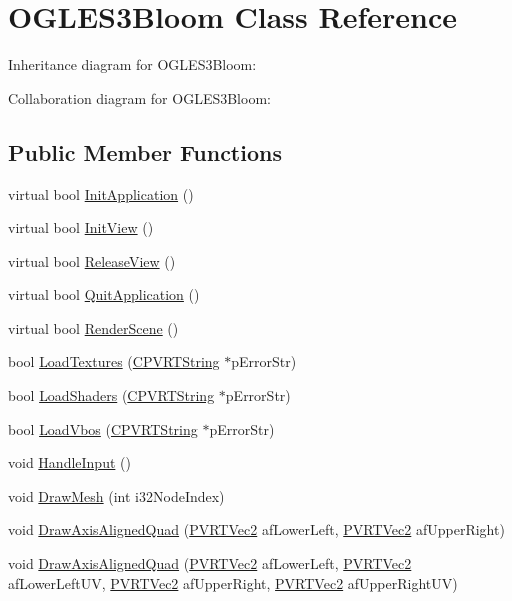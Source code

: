 \hypertarget{class_o_g_l_e_s3_bloom}{\section{O\+G\+L\+E\+S3\+Bloom Class Reference}
\label{class_o_g_l_e_s3_bloom}
}


Inheritance diagram for O\+G\+L\+E\+S3\+Bloom\+:


Collaboration diagram for O\+G\+L\+E\+S3\+Bloom\+:
\subsection*{Public Member Functions}
\begin{DoxyCompactItemize}
\item 
virtual bool \hyperlink{class_o_g_l_e_s3_bloom_a0294d79d7c771eb5b80bd107f3cd6834}{Init\+Application} ()
\item 
virtual bool \hyperlink{class_o_g_l_e_s3_bloom_aa68b99e9d487744da611949d99767e8f}{Init\+View} ()
\item 
virtual bool \hyperlink{class_o_g_l_e_s3_bloom_a9f3245cfa958e12ae09036c33b3145ca}{Release\+View} ()
\item 
virtual bool \hyperlink{class_o_g_l_e_s3_bloom_a2d38997f9264c8df61f37c84f5357e78}{Quit\+Application} ()
\item 
virtual bool \hyperlink{class_o_g_l_e_s3_bloom_a59f9a13e4b1469773f0462059a008860}{Render\+Scene} ()
\item 
bool \hyperlink{class_o_g_l_e_s3_bloom_ab593e5fa5d3b7862034a7240372b6180}{Load\+Textures} (\hyperlink{class_c_p_v_r_t_string}{C\+P\+V\+R\+T\+String} $\ast$p\+Error\+Str)
\item 
bool \hyperlink{class_o_g_l_e_s3_bloom_a5ead5d12472053edd2e8a69c436a1920}{Load\+Shaders} (\hyperlink{class_c_p_v_r_t_string}{C\+P\+V\+R\+T\+String} $\ast$p\+Error\+Str)
\item 
bool \hyperlink{class_o_g_l_e_s3_bloom_a9c92d1fd1b8d856ce7999d7fc6958c1b}{Load\+Vbos} (\hyperlink{class_c_p_v_r_t_string}{C\+P\+V\+R\+T\+String} $\ast$p\+Error\+Str)
\item 
void \hyperlink{class_o_g_l_e_s3_bloom_ae17f0f31c2414eb5c843301a3f58ec4e}{Handle\+Input} ()
\item 
void \hyperlink{class_o_g_l_e_s3_bloom_a4830cc2f196e02025fa7c5db8863bbf2}{Draw\+Mesh} (int i32\+Node\+Index)
\item 
void \hyperlink{class_o_g_l_e_s3_bloom_aa2614d595dd406577b74d14234353cb8}{Draw\+Axis\+Aligned\+Quad} (\hyperlink{struct_p_v_r_t_vec2}{P\+V\+R\+T\+Vec2} af\+Lower\+Left, \hyperlink{struct_p_v_r_t_vec2}{P\+V\+R\+T\+Vec2} af\+Upper\+Right)
\item 
void \hyperlink{class_o_g_l_e_s3_bloom_a8a9c905a1e05b7d54f962f77a5cb2e64}{Draw\+Axis\+Aligned\+Quad} (\hyperlink{struct_p_v_r_t_vec2}{P\+V\+R\+T\+Vec2} af\+Lower\+Left, \hyperlink{struct_p_v_r_t_vec2}{P\+V\+R\+T\+Vec2} af\+Lower\+Left\+U\+V, \hyperlink{struct_p_v_r_t_vec2}{P\+V\+R\+T\+Vec2} af\+Upper\+Right, \hyperlink{struct_p_v_r_t_vec2}{P\+V\+R\+T\+Vec2} af\+Upper\+Right\+U\+V)
\end{DoxyCompactItemize}


